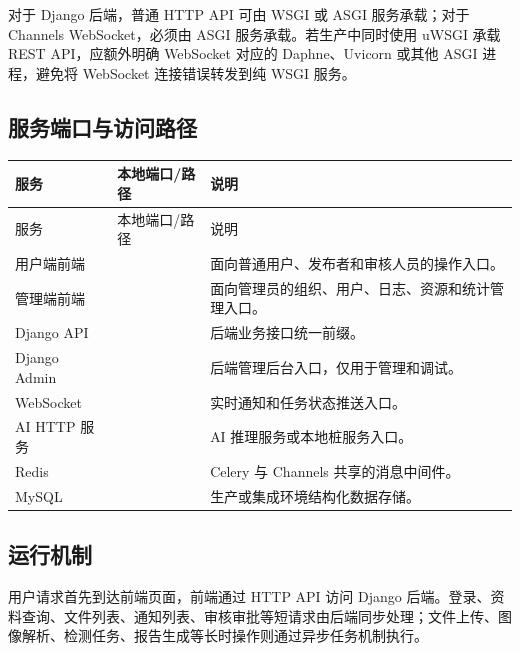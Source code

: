 对于 Django 后端，普通 HTTP API 可由 WSGI 或 ASGI 服务承载；对于 Channels WebSocket，必须由 ASGI 服务承载。若生产中同时使用 uWSGI 承载 REST API，应额外明确 WebSocket 对应的 Daphne、Uvicorn 或其他 ASGI 进程，避免将 WebSocket 连接错误转发到纯 WSGI 服务。

\subsection{服务端口与访问路径}
\begingroup
\small
\setlength{\tabcolsep}{4pt}
\renewcommand{\arraystretch}{1.15}
\begin{longtable}{|L{3.2cm}|L{3.6cm}|L{6.2cm}|}
\hline
服务 & 本地端口/路径 & 说明 \\ \hline
\endfirsthead
\hline
服务 & 本地端口/路径 & 说明 \\ \hline
\endhead
\hline
\endfoot
\hline
\endlastfoot
用户端前端 &  & 面向普通用户、发布者和审核人员的操作入口。 \\ \hline
管理端前端 &  & 面向管理员的组织、用户、日志、资源和统计管理入口。 \\ \hline
Django API &  & 后端业务接口统一前缀。 \\ \hline
Django Admin &  & 后端管理后台入口，仅用于管理和调试。 \\ \hline
WebSocket &  & 实时通知和任务状态推送入口。 \\ \hline
AI HTTP 服务 &  & AI 推理服务或本地桩服务入口。 \\ \hline
Redis &  & Celery 与 Channels 共享的消息中间件。 \\ \hline
MySQL &  & 生产或集成环境结构化数据存储。 \\ \hline
\end{longtable}
\endgroup

\subsection{运行机制}
用户请求首先到达前端页面，前端通过 HTTP API 访问 Django 后端。登录、资料查询、文件列表、通知列表、审核审批等短请求由后端同步处理；文件上传、图像解析、检测任务、报告生成等长时操作则通过异步任务机制执行。

